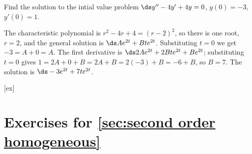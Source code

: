 
\begin{example}{}{}\label{}
 Find the solution to the intial value problem
$\ds y''-4y'+4y=0$, $y(0)=-3$, $y'(0)=1$.
\end{example}

\begin{solution}
The characteristic polynomial is $r^2-4r+4=(r-2)^2$, so there is one root,
$r=2$, 
and the general solution is $\ds Ae^{2t}+Bte^{2t}$. Substituting
$t=0$ we get $-3=A+0=A$. The first derivative is
$\ds 2Ae^{2t}+2Bte^{2t}+Be^{2t}$; substituting $t=0$ gives
$1=2A+0+B=2A+B=2(-3)+B=-6+B$, so $B=7$. The solution is
$\ds -3e^{2t}+7te^{2t}$.
\end{solution}


[ex]
\section*{Exercises for \ref{sec:second order homogeneous}}

